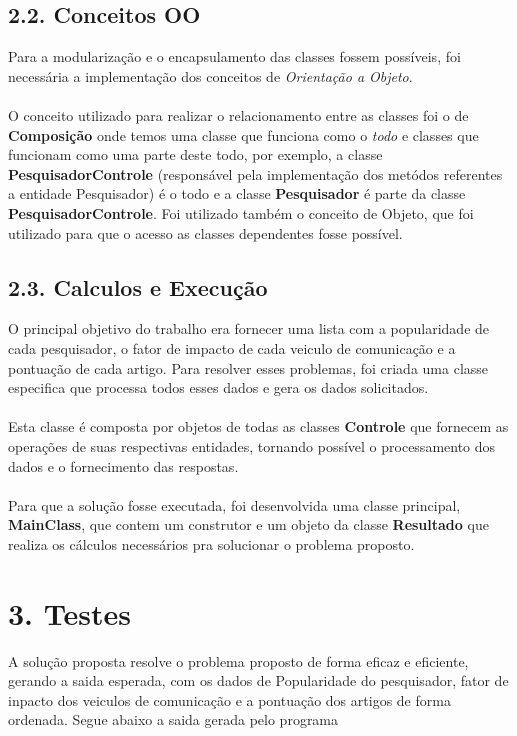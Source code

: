 \documentclass[12pt, a4paper]{article}
\begin{document}
  \subsection*{2.2. Conceitos OO}
    Para a modularização e o encapsulamento das classes fossem possíveis, foi necessária a implementação dos conceitos de \textit{Orientação a Objeto}.\\\\
    O conceito utilizado para realizar o relacionamento entre as classes foi o de \textbf{Composição} onde temos uma classe que funciona como o \textit{todo} e classes que funcionam como uma parte deste todo, por exemplo, a classe \textbf{PesquisadorControle} (responsável pela implementação dos metódos referentes a entidade Pesquisador) é o todo e a classe \textbf{Pesquisador} é parte da classe \textbf{PesquisadorControle}.
    Foi utilizado também o conceito de Objeto, que foi utilizado para que o acesso as classes dependentes fosse possível.

  \subsection*{2.3. Calculos e Execução}
    O principal objetivo do trabalho era fornecer uma lista com a popularidade de cada pesquisador, o fator de impacto de cada veiculo de comunicação e a pontuação de cada artigo. Para resolver esses problemas, foi criada uma classe especifica que processa todos esses dados e gera os dados solicitados.\\\\
    Esta classe é composta por objetos de todas as classes \textbf{Controle} que fornecem as operações de suas respectivas entidades, tornando possível o processamento dos dados e o fornecimento das respostas.\\\\
    Para que a solução fosse executada, foi desenvolvida uma classe principal, \textbf{MainClass}, que contem um construtor e um objeto da classe \textbf{Resultado} que realiza os cálculos necessários pra solucionar o problema proposto.


\section*{3. Testes}
  A solução proposta resolve o problema proposto de forma eficaz e eficiente, gerando a saida esperada, com os dados de Popularidade do pesquisador, fator de inpacto dos veiculos de comunicação e a pontuação dos artigos de forma ordenada. Segue abaixo a saida gerada pelo programa\\
\end{document}
